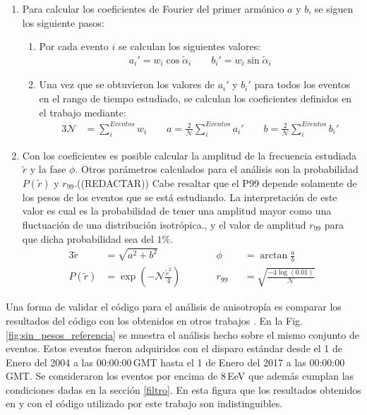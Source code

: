 \begin{enumerate}
        \item Para calcular los coeficientes de Fourier del primer armónico $a$ y $b$, se siguen los siguiente pasos:
        \begin{enumerate}
          \item Por cada evento  $i$ se calculan los siguientes valores:
          \begin{align}
             a_i' = {w_i}\cos\tilde{\alpha}_i \qquad
             b_i' = {w_i}\sin\tilde{\alpha}_i
         \end{align}
         \item Una vez que se obtuvieron los valores de $a_i'$ y $b_i'$ para todos los eventos en el rango de tiempo estudiado, se calculan los coeficientes definidos en el trabajo \cite{analisis_fourier} mediante:
         \begin{alignat}{3}
          \mathcal{N} &= \sum^{Eventos}_i w_i \qquad
            a = \frac{2}{\mathcal{N}} \sum^{Eventos}_i a_i' \qquad
            b = \frac{2}{\mathcal{N}} \sum^{Eventos}_i b_i'  
         \end{alignat}
        \end{enumerate}
        \item Con los coeficientes es posible calcular la amplitud de la frecuencia estudiada $\tilde{r}$ y la fase $\phi$. Otros parámetros calculados para el análisis son la probabilidad $P(\tilde{r})$  y $r_{99}$.((REDACTAR)) Cabe resaltar que el P99 depende solamente de los pesos de los eventos que se está estudiando. La interpretación  de este valor es cual es la probabilidad de tener una amplitud mayor como una fluctuación de una distribución isotrópica., y el valor de amplitud $r_{99}$ para que dicha probabilidad sea del $1$\%.
        \begin{alignat}{3}
            \tilde{r} &= \sqrt{a^2 +b^2}                        \qquad &&   \phi&&= \arctan\frac{a}{b}\\
          P(\tilde{r})&= \exp(-\mathcal{N}\frac{\tilde{r}^2}{4})\qquad &&   r_{99}&&= \sqrt{\frac{-4\log(0.01)}{\mathcal{N}}}
        \end{alignat}

      \end{enumerate}

    Una forma de validar el código para el análisis de anisotropía es comparar los resultados del código con los obtenidos en otros trabajos \cite{taborda}. En la Fig.\ref{fig:sin_pesos_referencia} se muestra el análisis hecho sobre el mismo conjunto de eventos. Estos eventos fueron adquiridos con el disparo estándar desde el 1 de Enero del 2004 a las 00:00:00\,GMT  hasta el 1 de Enero del 2017 a las 00:00:00\,GMT. Se consideraron los eventos por encima de $8\,$EeV que además cumplan las condiciones dadas en la sección \ref{filtro}.  En esta figura que los resultados obtenidos en \cite{taborda} y con el código utilizado por este trabajo son indistinguibles. 

